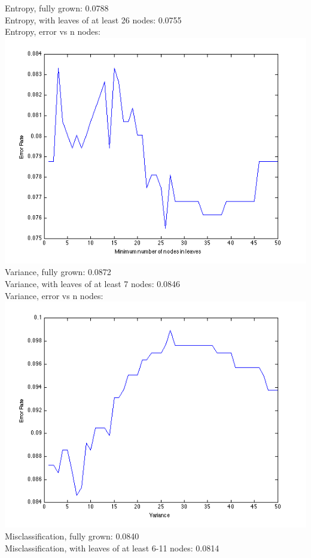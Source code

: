 \documentclass[11pt,a4paper]{article}
\begin{document}
Entropy, fully grown: 0.0788\\
Entropy, with leaves of at least 26 nodes: 0.0755\\
Entropy, error vs n nodes:\\
\includegraphics[width=\textwidth]{decision_tree_entropy_error_vs_n_nodes.png}
Variance, fully grown: 0.0872 \\
Variance, with leaves of at least 7 nodes: 0.0846 \\
Variance, error vs n nodes:\\
\includegraphics[width=\textwidth]{decision_tree_variance_error_vs_n_nodes.png}
Misclassification, fully grown: 0.0840\\
Misclassification, with leaves of at least 6-11 nodes: 0.0814 \\
\end{document}

